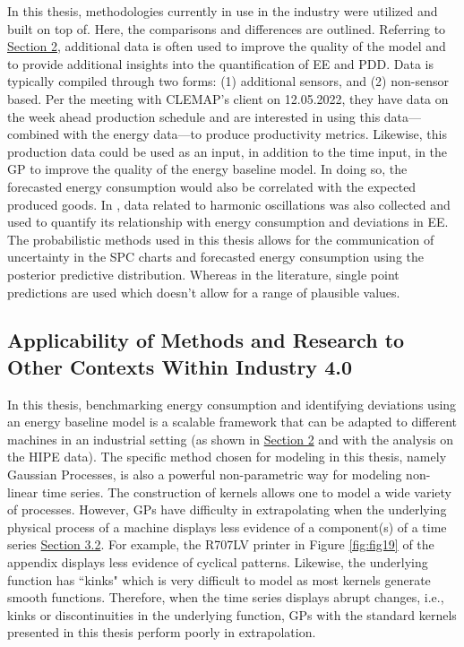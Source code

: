 In this thesis, methodologies currently in use in the industry were utilized and built on top of. Here, the comparisons and differences are outlined. Referring to \hyperlink{section.2}{Section 2}, additional data is often used to improve the quality of the model and to provide additional insights into the quantification of EE and PDD. Data is typically compiled through two forms: (1) additional sensors, and (2) non-sensor based. Per the meeting with CLEMAP's client on 12.05.2022, they have data on the week ahead production schedule and are interested in using this data—combined with the energy data—to produce productivity metrics. Likewise, this production data could be used as an input, in addition to the time input, in the GP to improve the quality of the energy baseline model. In doing so, the forecasted energy consumption would also be correlated with the expected produced goods. In \cite{HIPE} \cite{boiler} \cite{gas-turbine-faults}, data related to harmonic oscillations was also collected and used to quantify its relationship with energy consumption and deviations in EE. The probabilistic methods used in this thesis allows for the communication of uncertainty in the SPC charts and forecasted energy consumption using the posterior predictive distribution. Whereas in the literature, single point predictions are used which doesn't allow for a range of plausible values. 

\subsection{Applicability of Methods and Research to Other Contexts Within Industry 4.0}

In this thesis, benchmarking energy consumption and identifying deviations using an energy baseline model is a scalable framework that can be adapted to different machines in an industrial setting (as shown in \hyperlink{section.2}{Section 2} and with the analysis on the HIPE data). The specific method chosen for modeling in this thesis, namely Gaussian Processes, is also a powerful non-parametric way for modeling non-linear time series. The construction of kernels allows one to model a wide variety of processes. However, GPs have difficulty in extrapolating when the underlying physical process of a machine displays less evidence of a component(s) of a time series \hyperlink{subsection.3.2}{Section 3.2}. For example, the R707LV printer in Figure \ref{fig:fig19} of the appendix displays less evidence of cyclical patterns. Likewise, the underlying function has ``kinks" which is very difficult to model as most kernels generate smooth functions. Therefore, when the time series displays abrupt changes, i.e., kinks or discontinuities in the underlying function, GPs with the standard kernels presented in this thesis perform poorly in extrapolation. 

